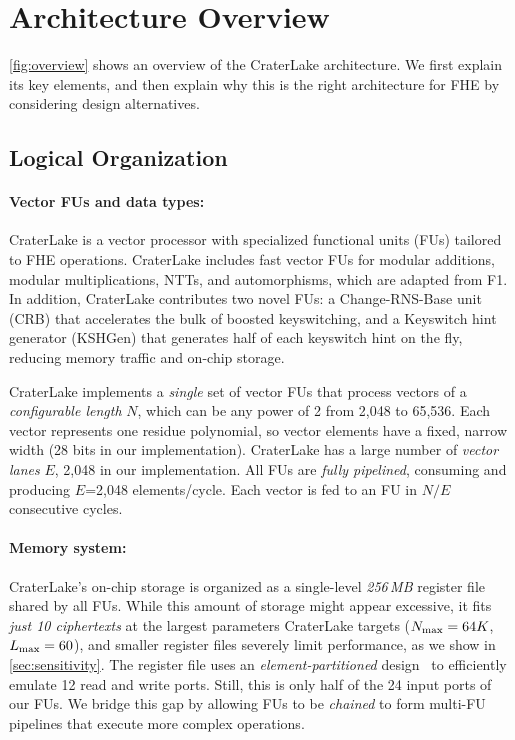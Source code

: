 \section{Architecture Overview}\label{sec:overview}

\autoref{fig:overview} shows an overview of the CraterLake architecture. We first
explain its key elements, and then explain why this is the right architecture
for FHE by considering design alternatives.

\subsection{Logical Organization}

\paragraph{Vector FUs and data types:}
CraterLake is a vector processor with specialized functional units (FUs)
tailored to FHE operations. CraterLake includes fast vector FUs for modular
additions, modular multiplications, NTTs, and automorphisms, which are adapted
from F1. In addition, CraterLake contributes two novel FUs: a Change-RNS-Base
unit (CRB) that accelerates the bulk of boosted keyswitching, and a Keyswitch
hint generator (KSHGen) that generates half of each keyswitch hint on the fly,
reducing memory traffic and on-chip storage.

\figOverview

CraterLake implements a \emph{single} set of vector FUs that process vectors of
a \emph{configurable length} $N$, which can be any power of 2 from 2,048 to
65,536. Each vector represents one residue polynomial, so vector elements have
a fixed, narrow width (28 bits in our implementation). CraterLake has a large
number of \emph{vector lanes} $E$, 2,048 in our implementation. All FUs are
\emph{fully pipelined}, consuming and producing $E$=2,048 elements/cycle. Each
vector is fed to an FU in $N/E$ consecutive cycles.

\paragraph{Memory system:}
CraterLake's on-chip storage is organized as a single-level \emph{256\,MB}
register file shared by all FUs. While this amount of storage might appear
excessive, it fits \emph{just 10 ciphertexts} at the largest parameters
CraterLake targets ($N_{\textrm{max}} = 64K$, $L_{\textrm{max}} = 60$), and smaller register files
severely limit performance, as we show in \autoref{sec:sensitivity}. The
register file uses an \emph{element-partitioned}
design~\cite{asanovic:ucb98:vector} to efficiently emulate 12 read and write
ports. Still, this is only half of the 24 input ports of our FUs. We bridge
this gap by allowing FUs to be \emph{chained} to form multi-FU pipelines that
execute more complex operations.

